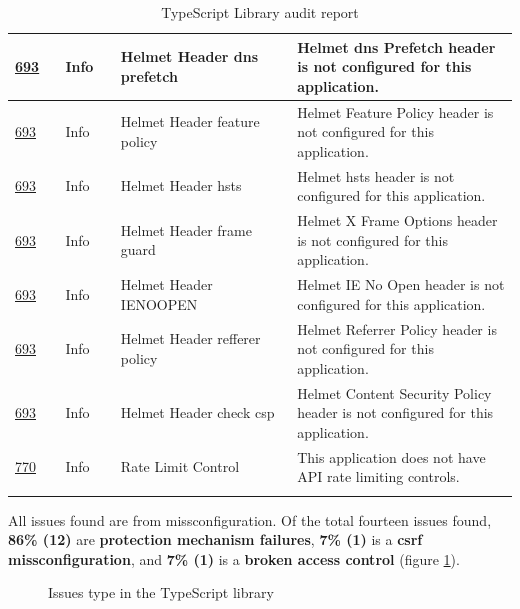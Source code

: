 \begin{longtable}{||p{0.1\linewidth} | p{0.11\linewidth} | p{0.35\linewidth} | p{0.45\linewidth}||}
    \hline
    \href{https://cwe.mitre.org/data/definitions/693.html}{693} & Info              & Helmet Header \acrshort{dns} prefetch & Helmet \acrshort{dns} Prefetch header is not configured for this application.                                     \\
    \hline
    \href{https://cwe.mitre.org/data/definitions/693.html}{693} & Info              & Helmet Header feature policy          & Helmet Feature Policy header is not configured for this application.                                              \\
    \hline
    \href{https://cwe.mitre.org/data/definitions/693.html}{693} & Info              & Helmet Header \acrshort{hsts}         & Helmet \acrshort{hsts} header is not configured for this application.                                             \\
    \hline
    \href{https://cwe.mitre.org/data/definitions/693.html}{693} & Info              & Helmet Header frame guard             & Helmet X Frame Options header is not configured for this application.                                             \\
    \hline
    \href{https://cwe.mitre.org/data/definitions/693.html}{693} & Info              & Helmet Header IENOOPEN                & Helmet IE No Open header is not configured for this application.                                                  \\
    \hline
    \href{https://cwe.mitre.org/data/definitions/693.html}{693} & Info              & Helmet Header refferer policy         & Helmet Referrer Policy header is not configured for this application.                                             \\
    \hline
    \href{https://cwe.mitre.org/data/definitions/693.html}{693} & Info              & Helmet Header  check \acrshort{csp}   & Helmet Content Security Policy header is not configured for this application.                                     \\
    \hline
    \href{https://cwe.mitre.org/data/definitions/770.html}{770} & Info              & Rate Limit Control                    & This application does not have API rate limiting controls.                                                        \\[1ex]
    \hline
    \caption{TypeScript Library audit report}
    \label{tab:lib}
\end{longtable}

All issues found are from missconfiguration. Of the total fourteen issues found, \textbf{86\% (12)} are \textbf{protection mechanism failures}, \textbf{7\% (1)} is a \textbf{\acrshort{csrf} missconfiguration}, and \textbf{7\% (1)} is a \textbf{broken access control} (figure \ref{fig:pie-issues-type}).
\begin{figure}[h!]
    \centering
    \caption{Issues type in the TypeScript library}
    \label{fig:pie-issues-type}
\end{figure}
